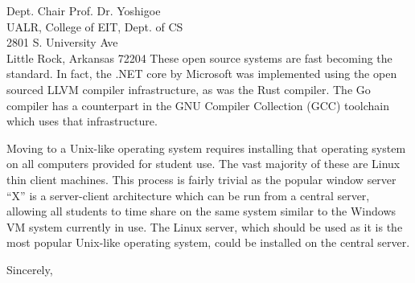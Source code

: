 \documentclass{letter}
\begin{document}
\begin{letter}{
    Dept. Chair Prof. Dr. Yoshigoe \\
    UALR, College of EIT, Dept. of CS \\
    2801 S. University Ave \\
    Little Rock, Arkansas 72204
  }
    These open source systems are fast becoming the standard. In fact, the .NET core by Microsoft was implemented using the open sourced LLVM compiler infrastructure, as was the Rust compiler. The Go compiler has a counterpart in the GNU Compiler Collection (GCC) toolchain which uses that infrastructure.

    Moving to a Unix-like operating system requires installing that operating system on all computers provided for student use. The vast majority of these are Linux thin client machines. This process is fairly trivial as the popular window server ``X'' is a server-client architecture which can be run from a central server, allowing all students to time share on the same system similar to the Windows VM system currently in use. The Linux server, which should be used as it is the most popular Unix-like operating system, could be installed on the central server.

    \closing{Sincerely,}

  \end{letter}

  \printglossaries
  \printbibliography
\end{document}
